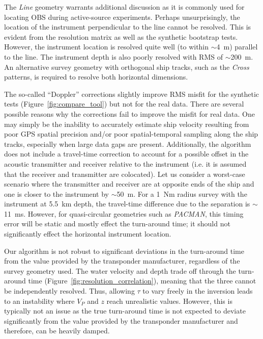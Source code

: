 The \textit{Line} geometry warrants additional discussion as it is commonly used for locating OBS during active-source experiments. Perhaps unsurprisingly, the location of the instrument perpendicular to the line cannot be resolved. This is evident from the resolution matrix as well as the synthetic bootstrap tests. However, the instrument location is resolved quite well (to within $\sim$4~m) parallel to the line. The instrument depth is also poorly resolved with RMS of $\sim$200~m. An alternative survey geometry with orthogonal ship tracks, such as the \textit{Cross} patterns, is required to resolve both horizontal dimensions.

The so-called ``Doppler'' corrections slightly improve RMS misfit for the synthetic tests (Figure~\ref{fig:compare_tool}) but not for the real data. There are several possible reasons why the corrections fail to improve the misfit for real data. One may simply be the inability to accurately estimate ship velocity resulting from poor GPS spatial precision and/or poor spatial-temporal sampling along the ship tracks, especially when large data gaps are present. Additionally, the algorithm does not include a travel-time correction to account for a possible offset in the acoustic transmitter and receiver relative to the instrument (i.e. it is assumed that the receiver and transmitter are colocated). Let us consider a worst-case scenario where the transmitter and receiver are at opposite ends of the ship and one is closer to the instrument by $\sim$50~m. For a 1~Nm radius survey with the instrument at 5.5~km depth, the travel-time difference due to the separation is $\sim$11~ms. However, for quasi-circular geometries such as \textit{PACMAN}, this timing error will be static and mostly effect the turn-around time; it should not significantly effect the horizontal instrument location.

Our algorithm is not robust to significant deviations in the turn-around time from the value provided by the transponder manufacturer, regardless of the survey geometry used. The water velocity and depth trade off through the turn-around time (Figure~\ref{fig:resolution_correlation}), meaning that the three cannot be independently resolved. Thus, allowing $\tau$ to vary freely in the inversion leads to an instability where $V_P$ and $z$ reach unrealistic values. However, this is typically not an issue as the true turn-around time is not expected to deviate significantly from the value provided by the transponder manufacturer and therefore, can be heavily damped.